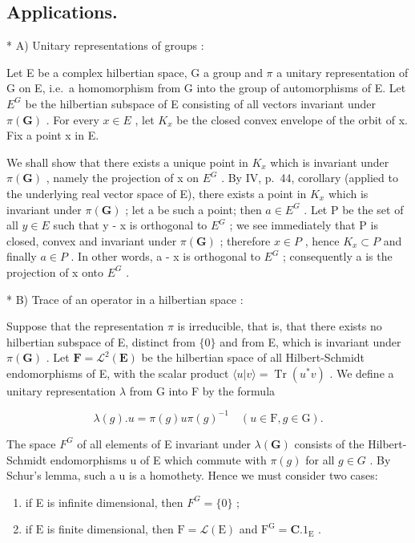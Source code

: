 \subsection{Applications.}

* A) Unitary representations of groups :

Let E be a complex hilbertian space, G a group and \(\pi\) a unitary representation of G on E, i.e.~a homomorphism from G into the group of automorphisms of E. Let \(E^{G}\) be the hilbertian subspace of E consisting of all vectors invariant under \(\pi(\mathbf{G})\) . For every \(x \in E\) , let \(K_{x}\) be the closed convex envelope of the orbit of x. Fix a point x in E.

We shall show that there exists a unique point in \(K_{x}\) which is invariant under \(\pi(\mathbf{G})\) , namely the projection of x on \(E^{G}\) . By IV, p.~44, corollary (applied to the underlying real vector space of E), there exists a point in \(K_{x}\) which is invariant under \(\pi(\mathbf{G})\) ; let a be such a point; then \(a \in E^{G}\) . Let P be the set of all \(y \in E\) such that y - x is orthogonal to \(E^{G}\) ; we see immediately that P is closed, convex and invariant under \(\pi(\mathbf{G})\) ; therefore \(x \in P\) , hence \(K_{x} \subset P\) and finally \(a \in P\) . In other words, a - x is orthogonal to \(E^{G}\) ; consequently a is the projection of x onto \(E^{G}\) .

* B) Trace of an operator in a hilbertian space :

Suppose that the representation \(\pi\) is irreducible, that is, that there exists no hilbertian subspace of E, distinct from \(\{0\}\) and from E, which is invariant under \(\pi(\mathbf{G})\) . Let \(\mathbf{F} = \mathcal{L}^{2}(\mathbf{E})\) be the hilbertian space of all Hilbert-Schmidt endomorphisms of E, with the scalar product \(\langle u|v\rangle = \operatorname{Tr}(u^{*}v)\) . We define a unitary representation \(\lambda\) from G into F by the formula

\[
\lambda (g). u = \pi (g) u \pi (g) ^ {- 1} \quad (u \in \mathrm{F}, g \in \mathrm{G}).\tag{3}
\]

The space \(F^{G}\) of all elements of E invariant under \(\lambda(\mathbf{G})\) consists of the Hilbert-Schmidt endomorphisms u of E which commute with \(\pi(g)\) for all \(g \in G\) . By Schur's lemma, such a u is a homothety. Hence we must consider two cases:

\begin{enumerate}
\def\labelenumi{\arabic{enumi})}
\item
  if E is infinite dimensional, then \(F^{G} = \{0\}\) ;
\item
  if \(\mathrm{E}\) is finite dimensional, then \(\mathrm{F} = \mathcal{L}(\mathrm{E})\) and \(\mathrm{F}^{\mathrm{G}} = \mathbf{C}.1_{\mathrm{E}}\) .
\end{enumerate}


